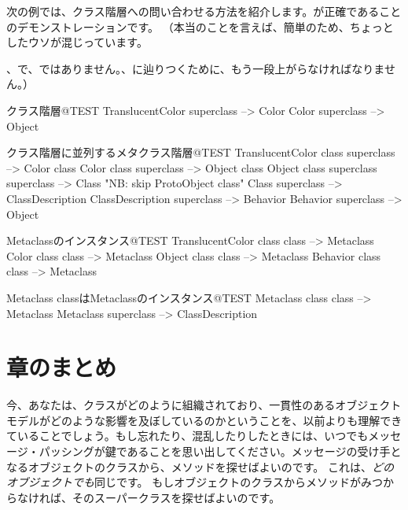 \documentclass[a4paper,10pt,twoside]{book}
\begin{document}
次の例では、クラス階層への問い合わせる方法を紹介します。が正確であることのデモンストレーションです。
（本当のことを言えば、簡単のため、ちょっとしたウソが混じっています。 {、で、ではありません。、に辿りつくために、もう一段上がらなければなりません。）

\begin{example}{クラス階層}{@TEST}
TranslucentColor superclass --> Color
Color superclass                   --> Object
\end{example}

\begin{example}{クラス階層に並列するメタクラス階層}{@TEST}
TranslucentColor class superclass   --> Color class
Color class superclass                     --> Object class
Object class superclass superclass --> Class    "NB: skip ProtoObject class"
Class superclass                              --> ClassDescription
ClassDescription superclass            --> Behavior
Behavior superclass                         --> Object
\end{example}

\begin{example}{Metaclassのインスタンス}{@TEST}
TranslucentColor class class --> Metaclass
Color class class                   --> Metaclass
Object class class                 --> Metaclass
Behavior class class              --> Metaclass
\end{example}
\begin{example}{Metaclass classはMetaclassのインスタンス}{@TEST}
Metaclass class class --> Metaclass
Metaclass superclass --> ClassDescription
\end{example}

\section{章のまとめ}
今、あなたは、クラスがどのように組織されており、一貫性のあるオブジェクトモデルがどのような影響を及ぼしているのかということを、以前よりも理解できていることでしょう。もし忘れたり、混乱したりしたときには、いつでもメッセージ・パッシングが鍵であることを思い出してください。メッセージの受け手となるオブジェクトのクラスから、メソッドを探せばよいのです。
これは、\emph{どのオブジェクトでも}同じです。
もしオブジェクトのクラスからメソッドがみつからなければ、そのスーパークラスを探せばよいのです。

}
\end{document}

